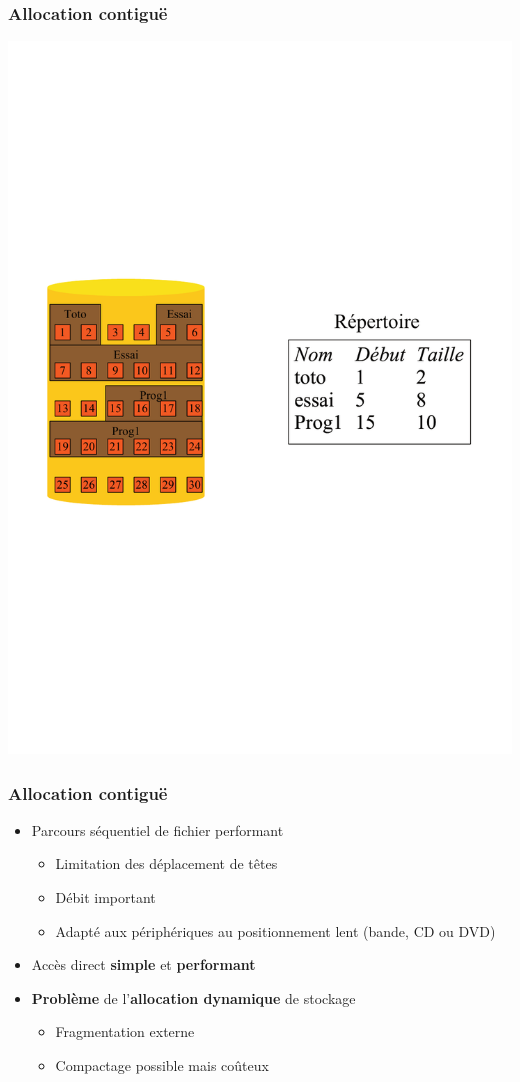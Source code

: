 \begin{frame}
\frametitle{Allocation contiguë}
\includegraphics[width=.9\textwidth]{../illustration/allocation_contigue.pdf}
\end{frame}

\begin{frame}
\frametitle{Allocation contiguë}
\begin{itemize}
\item Parcours séquentiel de fichier performant
\begin{itemize}
\item Limitation des déplacement de têtes
\item Débit important
\item Adapté aux périphériques au positionnement lent (bande, CD ou DVD)
\end{itemize}
\item Accès direct \textbf{simple} et \textbf{performant}
\item \textbf{Problème} de l'\textbf{allocation dynamique} de stockage
\begin{itemize}
\item Fragmentation externe
\item Compactage possible mais coûteux
\end{itemize}
\end{itemize}
\end{frame}

